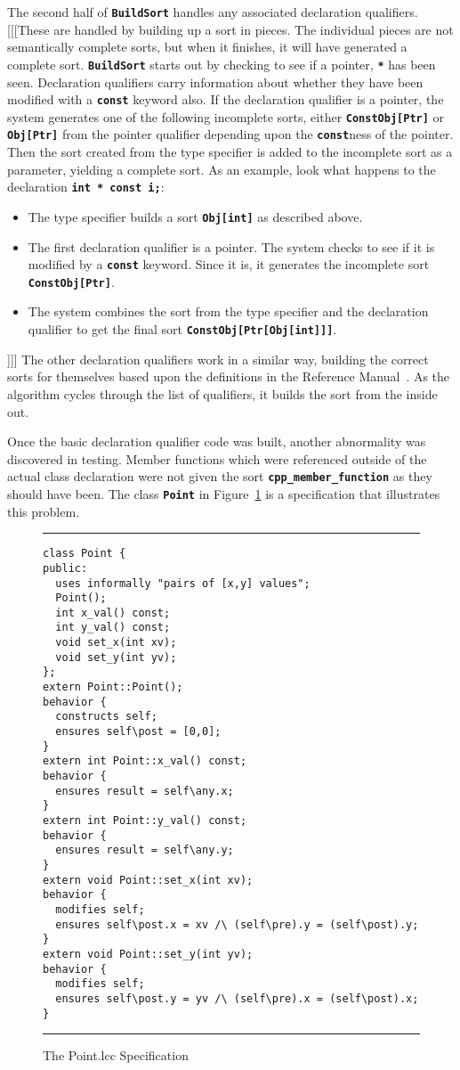 \documentclass[12pt]{article} %
\newcommand{\reserved}[1]{\textbf{\texttt{#1}}} %
\newcommand{\UNSPACEFORBOX}{\vspace{-2ex}}
\newcommand{\HLINE}{\UNSPACEFORBOX%
\begin{flushleft}\rule{\textwidth}{0.01in}\end{flushleft}%
\UNSPACEFORBOX}
\newenvironment{BFIGURE}{

\begin{figure}
\small
\HLINE
}{
\HLINE
\normalsize
\end{figure}
}
\begin{document}
The second half of \reserved{BuildSort} handles any associated
declaration qualifiers. [[[These are handled by building up a sort in
pieces. The individual pieces are not semantically complete sorts, but 
when it finishes, it will have generated a complete sort. \reserved{BuildSort} starts out by checking to see if a pointer,
\reserved{*} has been seen. Declaration qualifiers carry
information about whether they have been modified with a
\reserved{const} keyword also. If the declaration qualifier is a pointer, the system
generates one of the following incomplete sorts, either \reserved{ConstObj[Ptr]} or \reserved{Obj[Ptr]} from
the pointer qualifier depending upon the \reserved{const}ness of the
pointer. Then the sort created from the type
specifier is added to the incomplete sort as a parameter, yielding a
complete sort. As an example,
look what happens to the declaration \reserved{int * const i;}:
\begin{itemize}
\item The type specifier builds a sort \reserved{Obj[int]} as described
above.
\item The first declaration qualifier is a pointer. The system checks
to see if it is modified by a \reserved{const} keyword. Since it is,
it generates the incomplete sort \reserved{ConstObj[Ptr]}.
\item The system combines the sort from the type specifier and the
declaration qualifier to get the final sort \reserved{ConstObj[Ptr[Obj[int]]]}.
\end{itemize}
]]]
The other declaration qualifiers work in a similar way, building the
correct sorts for themselves based upon the definitions in the
Reference Manual~\cite{Leavens96c}. As the algorithm cycles through
the list of qualifiers, it builds the sort from the inside out.

Once the basic declaration qualifier code was built, another
abnormality was discovered in testing. Member functions which were
referenced outside of the actual class declaration were not given the
sort \reserved{cpp\_member\_function} as they should have been. The
class \reserved{Point} in Figure~\ref{Pointlcc} is a specification
that illustrates this problem.
\begin{BFIGURE}
\begin{verbatim}
class Point {
public:
  uses informally "pairs of [x,y] values";
  Point();
  int x_val() const;
  int y_val() const;
  void set_x(int xv);
  void set_y(int yv);
};
extern Point::Point();
behavior {
  constructs self;
  ensures self\post = [0,0];
}
extern int Point::x_val() const;
behavior {
  ensures result = self\any.x;
}
extern int Point::y_val() const;
behavior {
  ensures result = self\any.y;
}
extern void Point::set_x(int xv);
behavior {
  modifies self;
  ensures self\post.x = xv /\ (self\pre).y = (self\post).y;
}
extern void Point::set_y(int yv);
behavior {
  modifies self;
  ensures self\post.y = yv /\ (self\pre).x = (self\post).x;
}
\end{verbatim}
\caption{The Point.lcc Specification}
\label{Pointlcc}
\end{BFIGURE}
\end{document}
